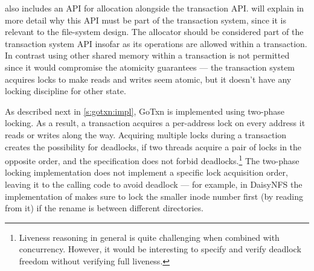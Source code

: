  also includes an API for allocation alongside the
transaction API.\@ {} will explain in more detail why this
API must be part of the transaction system, since it is relevant to the
file-system design.  The allocator should be considered part of the transaction
system API insofar as its operations are allowed within a transaction.
In contrast using other shared memory within a transaction is not permitted since it
would compromise the atomicity guarantees --- the transaction system acquires
locks to make reads and writes seem atomic, but it doesn't have any locking
discipline for other state.



As described next in \cref{s:gotxn:impl}, GoTxn is implemented using two-phase
locking. As a result, a transaction acquires a per-address lock on every address
it reads or writes along the way. Acquiring multiple locks during a transaction
creates the possibility for deadlocks, if two threads acquire a pair of locks in
the opposite order, and the specification does not forbid
deadlocks.\footnote{Liveness reasoning in general is quite challenging when
combined with concurrency. However, it would be interesting to specify and
verify deadlock freedom without verifying full liveness.} The two-phase locking
implementation does not implement a specific lock acquisition order, leaving it
to the calling code to avoid deadlock --- for example, in DaisyNFS the
implementation of  makes sure to lock the smaller inode number first
(by reading from it) if the rename is between different directories.
